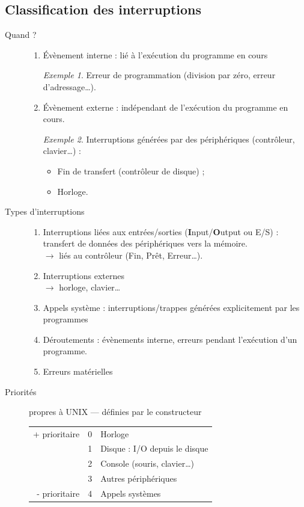 \documentclass[11pt,english,french]{scrreprt}
\theoremstyle{remark}
\newtheorem*{ex*}{Exemple}
\theoremstyle{definition}
\begin{document}
\subsection*{Classification des interruptions} %
\begin{description}
	\item [Quand ?]\hfill\begin{enumerate}
		\item Évènement interne : lié à l'exécution du programme en cours
		\begin{ex*}
			Erreur de programmation (division par zéro, erreur d'adressage\dots).
		\end{ex*}
		\item Évènement externe : indépendant de l'exécution du programme en cours.
		\begin{ex*}
			Interruptions générées par des périphériques (contrôleur, clavier\dots) :\begin{itemize}
				\item Fin de transfert (contrôleur de disque) ;
				\item Horloge.
			\end{itemize}
		\end{ex*}
	\end{enumerate}
	\item[Types d'interruptions]\hfill \begin{enumerate}
		\item Interruptions liées aux entrées/sorties (\textbf{I}nput/\textbf{O}utput ou E/S) : transfert de données des périphériques vers la mémoire.\\
		$\rightarrow$ liés au contrôleur (Fin, Prêt, Erreur\dots).
		\item Interruptions externes\\
		$\rightarrow$ horloge, clavier\dots
		\item Appels système : interruptions/trappes générées explicitement par les programmes
		\item Déroutements : évènements interne, erreurs pendant l'exécution d'un programme.
		\item Erreurs matérielles
	\end{enumerate}
	\item[Priorités] propres à UNIX --- définies par le constructeur\hfill\\
		\begin{tabular}{rcl}
			+ prioritaire	& 0 & Horloge\\
			 				& 1 & Disque : I/O depuis le disque\\
			 				& 2 & Console (souris, clavier\dots)\\
			 				& 3 & Autres périphériques\\
			- prioritaire	& 4 & Appels  systèmes
		\end{tabular}
\end{description}
\end{document}
